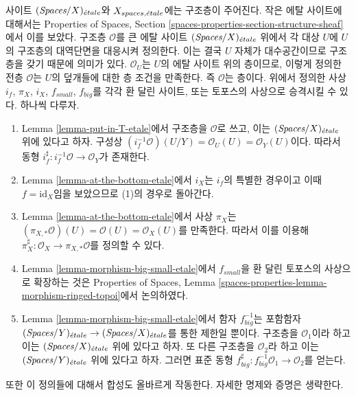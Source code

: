 \begin{remark}
\label{remark-change-topologies-ringed}
사이트 $(\textit{Spaces}/X)_{\acute{e}tale}$와 $X_{spaces, {\acute{e}tale}}$에는 구조층이
주어진다. 작은 에탈 사이트에 대해서는 Properties of Spaces, Section
\ref{spaces-properties-section-structure-sheaf}에서 이를 보았다. 구조층
$\mathcal{O}$를 큰 에탈 사이트 $(\textit{Spaces}/X)_{\acute{e}tale}$ 위에서 각 대상
$U$에 $U$의 구조층의 대역단면을 대응시켜 정의한다. 이는 결국 $U$ 자체가
대수공간이므로 구조층을 갖기 때문에 의미가 있다. $\mathcal{O}_U$는
$U$의 에탈 사이트 위의 층이므로, 이렇게 정의한 전층 $\mathcal{O}$는
$U$의 덮개들에 대한 층 조건을 만족한다. 즉 $\mathcal{O}$는 층이다.
위에서 정의한 사상 $i_f$, $\pi_X$, $i_X$, $f_{small}$, $f_{big}$를 각각
환 달린 사이트, 또는 토포스의 사상으로 승격시킬 수 있다. 하나씩 다루자.
\begin{enumerate}
\item Lemma \ref{lemma-put-in-T-etale}에서 구조층을 $\mathcal{O}$로 쓰고,
이는 $(\textit{Spaces}/X)_{\acute{e}tale}$ 위에 있다고 하자. 구성상
$(i_f^{-1}\mathcal{O})(U/Y) = \mathcal{O}_U(U) = \mathcal{O}_Y(U)$이다.
따라서 동형
$i_f^\sharp : i_f^{-1}\mathcal{O} \to \mathcal{O}_Y$가 존재한다.
\item Lemma \ref{lemma-at-the-bottom-etale}에서 $i_X$는 $i_f$의 특별한
경우이고 이때 $f = \text{id}_X$임을 보았으므로 (1)의 경우로
돌아간다.
\item Lemma \ref{lemma-at-the-bottom-etale}에서 사상 $\pi_X$는
$(\pi_{X, *}\mathcal{O})(U) = \mathcal{O}(U) = \mathcal{O}_X(U)$를 만족한다.
따라서 이를 이용해
$\pi_X^\sharp : \mathcal{O}_X \to \pi_{X, *}\mathcal{O}$를 정의할 수 있다.
\item Lemma \ref{lemma-morphism-big-small-etale}에서 $f_{small}$을 환 달린
토포스의 사상으로 확장하는 것은 Properties of Spaces, Lemma
\ref{spaces-properties-lemma-morphism-ringed-topoi}에서 논의하였다.
\item Lemma \ref{lemma-morphism-big-small-etale}에서 함자 $f_{big}^{-1}$는
포함함자
$(\textit{Spaces}/Y)_{\acute{e}tale} \to (\textit{Spaces}/X)_{\acute{e}tale}$를 통한 제한일
뿐이다. 구조층을 $\mathcal{O}_1$이라 하고 이는
$(\textit{Spaces}/X)_{\acute{e}tale}$ 위에 있다고 하자. 또 다른 구조층을
$\mathcal{O}_2$라 하고 이는 $(\textit{Spaces}/Y)_{\acute{e}tale}$ 위에 있다고 하자.
그러면 표준 동형
$f_{big}^\sharp : f_{big}^{-1}\mathcal{O}_1 \to \mathcal{O}_2$를 얻는다.
\end{enumerate}
또한 이 정의들에 대해서 합성도 올바르게 작동한다. 자세한 명제와 증명은
생략한다.
\end{remark}








